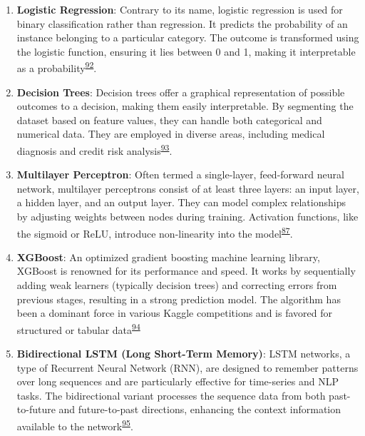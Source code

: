 \documentclass[
  10pt,
]{scrbook}
\let\originaltextbf\textbf
\renewcommand{\textbf}[1]{\textcolor{color1}{\textsf{\originaltextbf{#1}}}}
\begin{document}
\begin{enumerate}
\def\labelenumi{\arabic{enumi}.}
\item
  \textbf{Logistic Regression}: Contrary to its name, logistic
  regression is used for binary classification rather than regression.
  It predicts the probability of an instance belonging to a particular
  category. The outcome is transformed using the logistic function,
  ensuring it lies between 0 and 1, making it interpretable as a
  probability\textsuperscript{\protect\hyperlink{ref-McCullagh_1989}{92}}.
\item
  \textbf{Decision Trees}: Decision trees offer a graphical
  representation of possible outcomes to a decision, making them easily
  interpretable. By segmenting the dataset based on feature values, they
  can handle both categorical and numerical data. They are employed in
  diverse areas, including medical diagnosis and credit risk
  analysis\textsuperscript{\protect\hyperlink{ref-quinlan_1986}{93}}.
\item
  \textbf{Multilayer Perceptron}: Often termed a single-layer,
  feed-forward neural network, multilayer perceptrons consist of at
  least three layers: an input layer, a hidden layer, and an output
  layer. They can model complex relationships by adjusting weights
  between nodes during training. Activation functions, like the sigmoid
  or ReLU, introduce non-linearity into the
  model\textsuperscript{\protect\hyperlink{ref-Goodfellow-et-al-2016}{87}}.
\item
  \textbf{XGBoost}: An optimized gradient boosting machine learning
  library, XGBoost is renowned for its performance and speed. It works
  by sequentially adding weak learners (typically decision trees) and
  correcting errors from previous stages, resulting in a strong
  prediction model. The algorithm has been a dominant force in various
  Kaggle competitions and is favored for structured or tabular
  data\textsuperscript{\protect\hyperlink{ref-Chen_xgboost_2016}{94}}
\item
  \textbf{Bidirectional LSTM (Long Short-Term Memory)}: LSTM networks, a
  type of Recurrent Neural Network (RNN), are designed to remember
  patterns over long sequences and are particularly effective for
  time-series and NLP tasks. The bidirectional variant processes the
  sequence data from both past-to-future and future-to-past directions,
  enhancing the context information available to the
  network\textsuperscript{\protect\hyperlink{ref-graves_2005}{95}}.
\end{enumerate}
\end{document}
